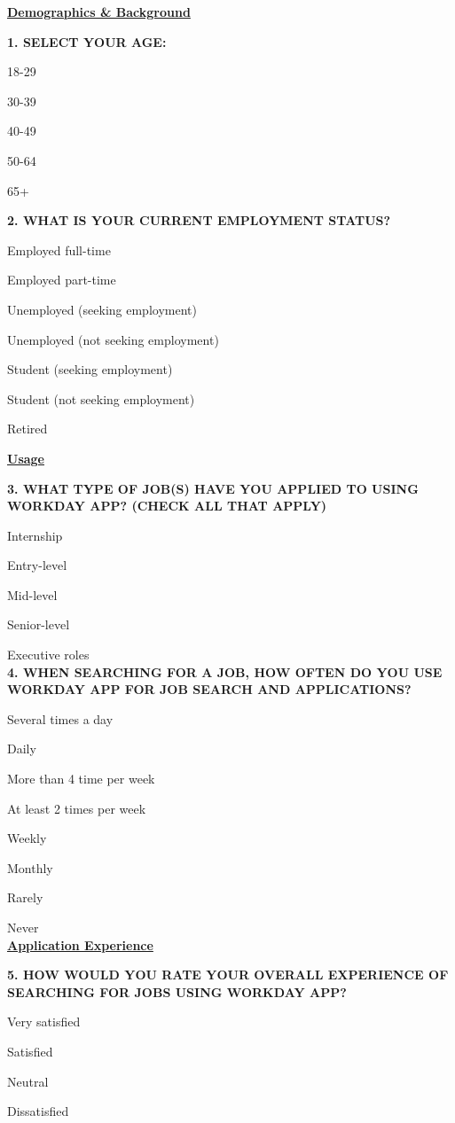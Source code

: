 \documentclass[
	letterpaper, %
]{jdf}
\begin{document}
\begin{sloppypar}
\underline{\textbf{Demographics \& Background}}

\textbf{1. SELECT YOUR AGE:}

18-29

30-39

40-49

50-64

65+

\hfill \break

\textbf{2. WHAT IS YOUR CURRENT EMPLOYMENT STATUS?}

Employed full-time

Employed part-time

Unemployed (seeking employment)

Unemployed (not seeking employment)

Student (seeking employment)

Student (not seeking employment)

Retired


\underline{\textbf{Usage  }}

\textbf{3. WHAT TYPE OF JOB(S) HAVE YOU APPLIED TO USING WORKDAY APP? (CHECK ALL THAT APPLY)
}

Internship

Entry-level

Mid-level

Senior-level

Executive roles \\



\textbf{4. WHEN SEARCHING FOR A JOB, HOW OFTEN DO YOU USE WORKDAY APP FOR JOB SEARCH AND APPLICATIONS?
}

Several times a day

Daily

More than 4 time per week

At least 2 times per week

Weekly

Monthly

Rarely

Never			
\\

\underline{\textbf{Application Experience  }}

\textbf{5. HOW WOULD YOU RATE YOUR OVERALL EXPERIENCE OF SEARCHING FOR JOBS  USING WORKDAY APP?}

Very satisfied

Satisfied

Neutral

Dissatisfied


\end{sloppypar}
\end{document}
